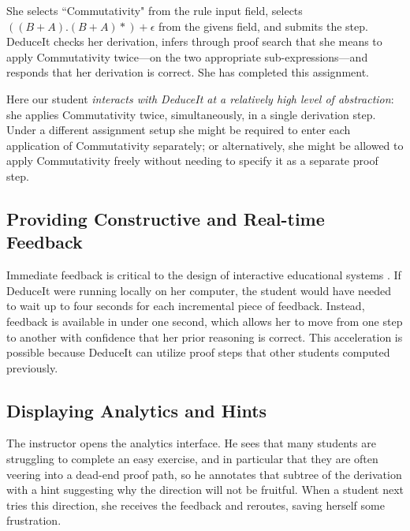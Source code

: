 \documentclass{sigchi}
\begin{document}
She selects ``Commutativity" from the rule input field, selects $((B+A).(B+A)*)+\epsilon$ from the givens field, and submits the step. DeduceIt checks her derivation, infers through proof search that she means to apply Commutativity twice---on the two appropriate sub-expressions---and responds that her derivation is correct. She has completed this assignment.

Here our student \textit{interacts with DeduceIt at a relatively high level of abstraction}: she applies Commutativity twice, simultaneously, in a single derivation step. Under a different assignment setup she might be required to enter each application of Commutativity separately; or alternatively, she might be allowed to apply Commutativity freely without needing to specify it as a separate proof step. %

\subsection{Providing Constructive and Real-time Feedback}
Immediate feedback is critical to the design of interactive educational systems \cite{locusoffeedback}. If DeduceIt were running locally on her computer, the student would have needed to wait up to four seconds for each incremental piece of feedback. Instead, feedback is available in under one second, which allows her to move from one step to another with confidence that her prior reasoning is correct. This acceleration is possible because DeduceIt can utilize proof steps that other students computed previously.

\subsection{Displaying Analytics and Hints}
The instructor opens the analytics interface. He sees that many students are struggling to complete an easy exercise, and in particular that they are often veering into a dead-end proof path, so he annotates that subtree of the derivation with a hint suggesting why the direction will not be fruitful. When a student next tries this direction, she receives the feedback and reroutes, saving herself some frustration.
\end{document}

